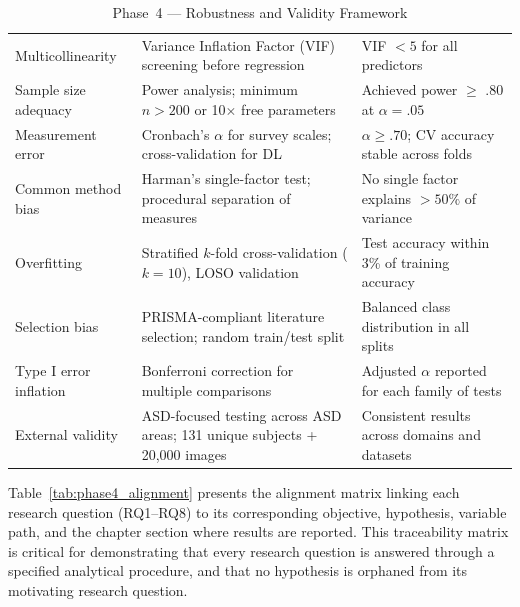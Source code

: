 \begin{xltabular}{\textwidth}{@{} l X X @{}}
\caption{Phase~4 --- Robustness and Validity Framework}
\label{tab:phase4_robustness}\\
\toprule
{} &  &  \\
\midrule
\endfirsthead
\endhead
\bottomrule
\endlastfoot
Multicollinearity         & Variance Inflation Factor (VIF) screening before regression      & VIF $< 5$ for all predictors \\
\addlinespace
Sample size adequacy      & Power analysis; minimum $n > 200$ or 10$\times$ free parameters & Achieved power $\geq$ .80 at $\alpha = .05$ \\
\addlinespace
Measurement error         & Cronbach's $\alpha$ for survey scales; cross-validation for DL   & $\alpha \geq .70$; CV accuracy stable across folds \\
\addlinespace
Common method bias        & Harman's single-factor test; procedural separation of measures   & No single factor explains $> 50\%$ of variance \\
\addlinespace
Overfitting               & Stratified $k$-fold cross-validation ($k = 10$), LOSO validation & Test accuracy within 3\% of training accuracy \\
\addlinespace
Selection bias             & PRISMA-compliant literature selection; random train/test split   & Balanced class distribution in all splits \\
\addlinespace
Type I error inflation     & Bonferroni correction for multiple comparisons                   & Adjusted $\alpha$ reported for each family of tests \\
\addlinespace
External validity          & ASD-focused testing across ASD areas; 131 unique subjects + 20{,}000 images       & Consistent results across domains and datasets \\
\end{xltabular}
\endgroup

\vspace{1.5em}

Table~\ref{tab:phase4_alignment} presents the alignment matrix linking each research question (RQ1--RQ8) to its corresponding objective, hypothesis, variable path, and the chapter section where results are reported. This traceability matrix is critical for demonstrating that every research question is answered through a specified analytical procedure, and that no hypothesis is orphaned from its motivating research question.


